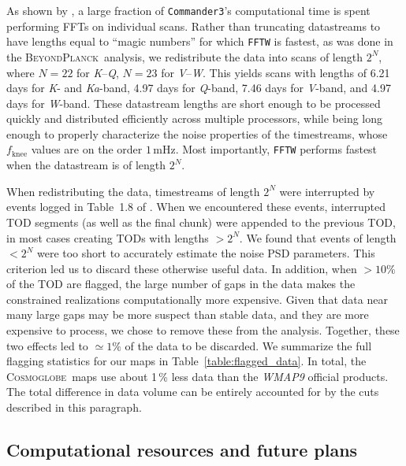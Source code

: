 \documentclass[twocolumn]{../../common/aa}
\def\commanderthree{\texttt{Commander3}}
\newcommand{\bp}{\textsc{BeyondPlanck}}
\newcommand{\Cosmoglobe}{\textsc{Cosmoglobe}}
\newcommand{\K}[0]{\textit K}
\newcommand{\Ka}[0]{\textit{Ka}}
\newcommand{\Q}[0]{\textit Q}
\newcommand{\V}[0]{\textit V}
\newcommand{\W}[0]{\textit W}
\begin{document}
As shown by \citet{bp03}, a large fraction of \commanderthree's computational time is spent performing FFTs on individual scans. Rather than truncating datastreams to have lengths equal to ``magic numbers'' for which \texttt{FFTW} \citep{FFTW05} is fastest, as was done in the \bp\ analysis, 
we redistribute the data into scans of length $2^N$, where $N=22$ for \K--\Q, $N=23$ for \V--\W. This yields scans with lengths of 6.21 days for \K- and \Ka-band, 4.97 days for \Q-band, 7.46 days for \V-band, and 4.97 days for \W-band.
These datastream lengths are short enough to be processed quickly and distributed efficiently across multiple processors, while being long enough to properly characterize the noise properties of the timestreams, whose $f_\mathrm{knee}$ values are on the order $1\,\mathrm{mHz}$. Most importantly, \texttt{FFTW} performs fastest when the datastream is of length $2^N$. 

When redistributing the data, timestreams of length $2^N$ were interrupted by events logged in Table~1.8 of \citet{wmapexsupp}.
When we encountered these events, interrupted TOD segments (as well as the final chunk) were appended to the previous TOD, in most cases creating TODs with lengths $>2^N$. We found that events of length $<2^N$ were too short to accurately estimate the noise PSD parameters. This criterion led us to discard these otherwise useful data. In addition, when $>10\%$ of the TOD are flagged, the large number of gaps in the data makes the constrained realizations computationally more expensive. Given that data near many large gaps may be more suspect than stable data, and they are more expensive to process, we chose to remove these from the analysis. Together, these two effects led to $\simeq1\%$ of the data to be discarded. We summarize the full flagging statistics for our maps in Table~\ref{table:flagged_data}. In total, the \Cosmoglobe\ maps use about 1\,\% less data than the \textit{WMAP9} official products. The total difference in data volume can be entirely accounted for by the cuts described in this paragraph.





\subsection{Computational resources and future plans}
\label{sec:resources}
\end{document}
